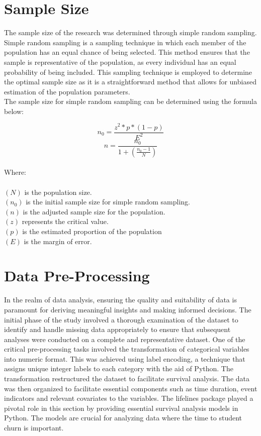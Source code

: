 \documentclass[doublespacing,12pt]{report}
\begin{document}
\section{Sample Size}
The sample size of the research was determined through simple random sampling. Simple random sampling is a sampling technique in which each member of the population has an equal chance of being selected. This method ensures that the sample is representative of the population, as every individual has an equal probability of being included. This sampling technique is employed to determine the optimal sample size as it is a straightforward method that allows for unbiased estimation of the population parameters.\\
The sample size for simple random sampling can be determined using the formula below:

\begin{equation}
n_0=\frac{z^2 \ast p \ast \left(1-p\right)}{E^2}
\end{equation}
\vspace{0.1cm}
\begin{equation}
n=\frac{n_0}{1+(\frac{n_0-1}{N})}
\end{equation}\\
Where:\\
\\
  \((N)\) is the population size.\\
  \((n_0)\) is the initial sample size for simple random sampling.\\
   \((n)\) is the adjusted sample size for the population.\\
  \((z)\) represents the critical value.\\
  \((p)\) is the estimated proportion of the population\\
 \((E)\) is the margin of error.\\

 

\section{Data Pre-Processing}

In the realm of data analysis, ensuring the quality and suitability of data is paramount for deriving meaningful insights and making informed decisions. The initial phase of the study involved a thorough examination of the dataset to identify and handle missing data appropriately to ensure that subsequent analyses were conducted on a complete and representative dataset. One of the critical pre-processing tasks involved the transformation of categorical variables into numeric format. This was achieved using label encoding, a technique that assigns unique integer labels to each category with the aid of Python. The transformation restructured the dataset to facilitate survival analysis. The data was then organized to facilitate essential components such as time duration, event indicators and relevant covariates to the variables. 
The lifelines package played a pivotal role in this section by providing essential survival analysis models in Python. The models are crucial for analyzing data where the time to student churn is important. 
\end{document}
